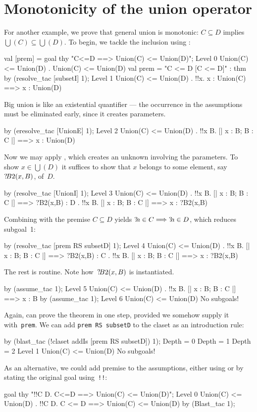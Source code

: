 \section{Monotonicity of the union operator}
For another example, we prove that general union is monotonic:
${C\subseteq D}$ implies $\bigcup(C)\subseteq \bigcup(D)$.  To begin, we
tackle the inclusion using :
\begin{ttbox}
val [prem] = goal thy "C<=D ==> Union(C) <= Union(D)";
{\out Level 0}
{\out Union(C) <= Union(D)}
{. Union(C) <= Union(D)}
{\out val prem = "C <= D  [C <= D]" : thm}
\ttbreak
by (resolve_tac [subsetI] 1);
{\out Level 1}
{\out Union(C) <= Union(D)}
{. !!x. x : Union(C) ==> x : Union(D)}
\end{ttbox}
Big union is like an existential quantifier --- the occurrence in the
assumptions must be eliminated early, since it creates parameters.
\begin{ttbox}
by (eresolve_tac [UnionE] 1);
{\out Level 2}
{\out Union(C) <= Union(D)}
{. !!x B. [| x : B; B : C |] ==> x : Union(D)}
\end{ttbox}
Now we may apply , which creates an unknown involving the
parameters.  To show $x\in \bigcup(D)$ it suffices to show that $x$ belongs
to some element, say~${?\!B2}(x,B)$, of~$D$.
\begin{ttbox}
by (resolve_tac [UnionI] 1);
{\out Level 3}
{\out Union(C) <= Union(D)}
{. !!x B. [| x : B; B : C |] ==> ?B2(x,B) : D}
{. !!x B. [| x : B; B : C |] ==> x : ?B2(x,B)}
\end{ttbox}
Combining  with the premise $C\subseteq D$ yields 
${?\!a}\in C \Longrightarrow {?\!a}\in D$, which reduces subgoal~1:
\begin{ttbox}
by (resolve_tac [prem RS subsetD] 1);
{\out Level 4}
{\out Union(C) <= Union(D)}
{. !!x B. [| x : B; B : C |] ==> ?B2(x,B) : C}
{. !!x B. [| x : B; B : C |] ==> x : ?B2(x,B)}
\end{ttbox}
The rest is routine.  Note how~${?\!B2}(x,B)$ is instantiated.
\begin{ttbox}
by (assume_tac 1);
{\out Level 5}
{\out Union(C) <= Union(D)}
{. !!x B. [| x : B; B : C |] ==> x : B}
by (assume_tac 1);
{\out Level 6}
{\out Union(C) <= Union(D)}
{\out No subgoals!}
\end{ttbox}
Again,  can prove the theorem in one
step, provided we somehow supply it with~{\tt prem}.  We can add
\hbox{\tt prem RS subsetD} to the claset as an introduction rule:
\begin{ttbox}
by (blast_tac (!claset addIs [prem RS subsetD]) 1);
{\out Depth = 0}
{\out Depth = 1}
{\out Depth = 2}
{\out Level 1}
{\out Union(C) <= Union(D)}
{\out No subgoals!}
\end{ttbox}
As an alternative, we could add premise to the assumptions, either using
 or by stating the original goal using~\texttt{!!}:
\begin{ttbox}
goal thy "!!C D. C<=D ==> Union(C) <= Union(D)";
{\out Level 0}
{\out Union(C) <= Union(D)}
{. !!C D. C <= D ==> Union(C) <= Union(D)}
by (Blast_tac 1);
\end{ttbox}

